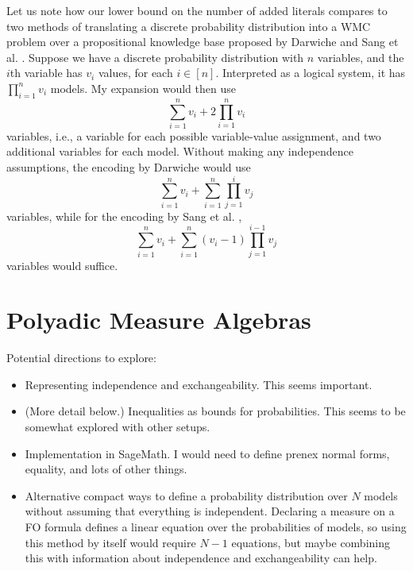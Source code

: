 \documentclass{article}
\theoremstyle{definition}
\theoremstyle{remark}
\begin{document}

Let us note how our lower bound on the number of added literals compares to two
methods of translating a discrete probability distribution into a WMC problem
over a propositional knowledge base proposed by Darwiche
\cite{DBLP:conf/kr/Darwiche02} and Sang et al. \cite{DBLP:conf/aaai/SangBK05}.
Suppose we have a discrete probability distribution with  $n$ variables, and the
$i$th variable has $v_i$ values, for each $i \in [n]$. Interpreted as a logical
system, it has $\prod_{i=1}^n v_i$ models. My expansion would then use
\[
  \sum_{i=1}^n v_i + 2\prod_{i=1}^n v_i
\]
variables, i.e., a variable for each possible variable-value assignment, and two
additional variables for each model. Without making any independence
assumptions, the encoding by Darwiche \cite{DBLP:conf/kr/Darwiche02} would use
\[
  \sum_{i=1}^n v_i + \sum_{i=1}^n \prod_{j=1}^i v_j
\]
variables, while for the encoding by Sang et al. \cite{DBLP:conf/aaai/SangBK05},
\[
  \sum_{i=1}^n v_i + \sum_{i=1}^n (v_i - 1) \prod_{j=1}^{i-1} v_j
\]
variables would suffice.

\section{Polyadic Measure Algebras}

Potential directions to explore:
\begin{itemize}
\item Representing independence and exchangeability. This seems important.
\item (More detail below.) Inequalities as bounds for probabilities. This seems
  to be somewhat explored with other setups.
\item Implementation in SageMath. I would need to define prenex normal forms,
  equality, and lots of other things.
\item Alternative compact ways to define a probability distribution over $N$
  models without assuming that everything is independent. Declaring a measure on
  a FO formula defines a linear equation over the probabilities of models, so
  using this method by itself would require $N-1$ equations, but maybe combining
  this with information about independence and exchangeability can help.
\end{itemize}
\end{document}
